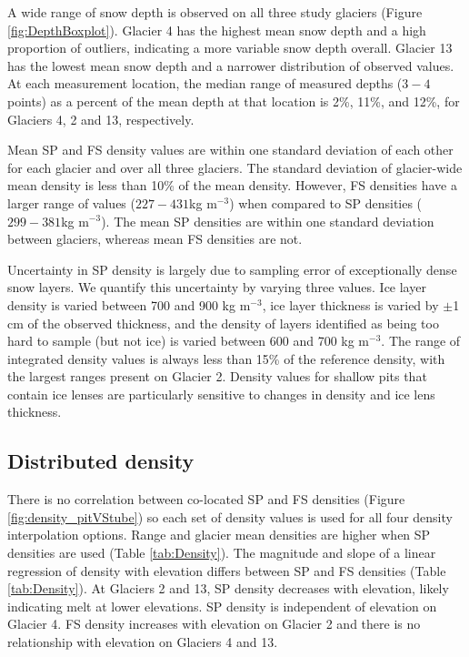 \documentclass[twocolumn,letterpaper]{igs}
\begin{document}
A wide range of snow depth is observed on all three study glaciers (Figure \ref{fig:DepthBoxplot}). Glacier 4 has the highest mean snow depth and a high proportion of outliers, indicating a more variable snow depth overall. Glacier 13 has the lowest mean snow depth and a narrower distribution of observed values. At each measurement location, the median range of measured depths ($3-4$ points) as a percent of the mean depth at that location is 2\%, 11\%, and 12\%, for Glaciers 4, 2 and 13, respectively. 

Mean SP and FS density values are within one standard deviation of each other for each glacier and over all three glaciers. The standard deviation of glacier-wide mean density is less than 10\% of the mean density. However, FS densities have a larger range of values ($227-431$kg m$^{-3}$) when compared to SP densities ($299-381$kg m$^{-3}$).  The mean SP densities are within one standard deviation between glaciers, whereas mean FS densities are not.

Uncertainty in SP density is largely due to sampling error of exceptionally dense snow layers. We quantify this uncertainty by varying three values. Ice layer density is varied between 700 and 900 kg m$^{-3}$, ice layer thickness is varied by $\pm$1 cm of the observed thickness, and the density of layers identified as being too hard to sample (but not ice) is varied between 600 and 700 kg m$^{-3}$. The range of integrated density values is always less than 15\% of the reference density, with the largest ranges present on Glacier 2. Density values for shallow pits that contain ice lenses are particularly sensitive to changes in density and ice lens thickness.

\subsection{Distributed density}

There is no correlation between co-located SP and FS densities (Figure \ref{fig:density_pitVStube}) so each set of density values is used for all four density interpolation options. Range and glacier mean densities are higher when SP densities are used (Table \ref{tab:Density}). The magnitude and slope of a linear regression of density with elevation differs between SP and FS densities (Table \ref{tab:Density}). At Glaciers 2 and 13, SP density decreases with elevation, likely indicating melt at lower elevations. SP density is independent of elevation on Glacier 4. FS density increases with elevation on Glacier 2 and there is no relationship with elevation on Glaciers 4 and 13. 
\end{document}

